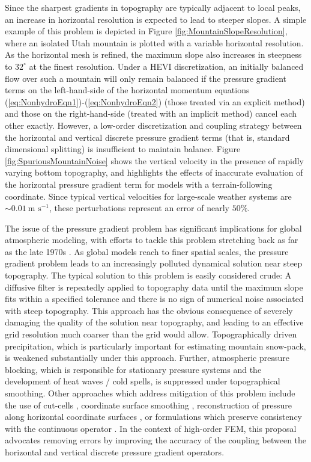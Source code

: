 \documentclass[11pt]{article}
\begin{document}
Since the sharpest gradients in topography are typically adjacent to local peaks, an increase in horizontal resolution is expected to lead to steeper slopes.  A simple example of this problem is depicted in Figure \ref{fig:MountainSlopeResolution}, where an isolated Utah mountain is plotted with a variable horizontal resolution.  As the horizontal mesh is refined, the maximum slope also increases in steepness to $32^\circ$ at the finest resolution.  Under a HEVI discretization, an initially balanced flow over such a mountain will only remain balanced if the pressure gradient terms on the left-hand-side of the horizontal momentum equations (\ref{eq:NonhydroEqn1})-(\ref{eq:NonhydroEqn2}) (those treated via an explicit method) and those on the right-hand-side (treated with an implicit method) cancel each other exactly.  However, a low-order discretization and coupling strategy between the horizontal and vertical discrete pressure gradient terms (that is, standard dimensional splitting) is insufficient to maintain balance.  Figure \ref{fig:SpuriousMountainNoise} shows the vertical velocity in the presence of rapidly varying bottom topography, and highlights the effects of inaccurate evaluation of the horizontal pressure gradient term for models with a terrain-following coordinate.  Since typical vertical velocities for large-scale weather systems are $\sim 0.01\ \mbox{m\ s}^{-1}$, these perturbations represent an error of nearly $50\%$.

The issue of the pressure gradient problem has significant implications for global atmospheric modeling, with efforts to tackle this problem stretching back as far as the late 1970s \citep{ZIJ1977BzPdA, DTMZIJ1986MAP}.  As global models reach to finer spatial scales, the pressure gradient problem leads to an increasingly polluted dynamical solution near steep topography.  The typical solution to this problem is easily considered crude:  A diffusive filter is repeatedly applied to topography data until the maximum slope fits within a specified tolerance and there is no sign of numerical noise associated with steep topography.  This approach has the obvious consequence of severely damaging the quality of the solution near topography, and leading to an effective grid resolution much coarser than the grid would allow.  Topographically driven precipitation, which is particularly important for estimating mountain snow-pack, is weakened substantially under this approach.  Further, atmospheric pressure blocking, which is responsible for stationary pressure systems and the development of heat waves / cold spells, is suppressed under topographical smoothing.  Other approaches which address mitigation of this problem include the use of cut-cells \citep{JSSHPAD2013GMDD}, coordinate surface smoothing \citep{JBK2011MWR}, reconstruction of pressure along horizontal coordinate surfaces \cite{GZ2012MWR}, or formulations which preserve consistency with the continuous operator \citep{SJL1997QJRMS}.  In the context of high-order FEM, this proposal advocates removing errors by improving the accuracy of the coupling between the horizontal and vertical discrete pressure gradient operators.
\end{document}
